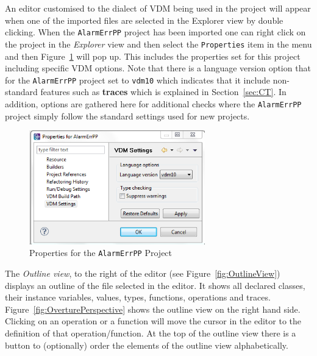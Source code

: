 An editor customised to the dialect of VDM being used in the project
will appear when one of the imported files are selected in the
Explorer view by double clicking. When the
\texttt{AlarmErrPP} project has been imported one can right click on the
project in the \emph{Explorer} view and then select the
\texttt{Properties} item in the menu and then
Figure~\ref{fig:settings} will pop up. This includes the properties set
for this project including specific VDM options. Note that there is a
language version option that for the \texttt{AlarmErrPP}
project set to \texttt{vdm10} which indicates that it include
non-standard features such as {\bf\ttfamily traces} which is explained
in Section~\ref{sec:CT}. In addition, options are gathered here for
additional checks where the \texttt{AlarmErrPP} project simply follow
the standard settings used for new projects.

\begin{figure}[!htb]
\begin{center}
  \includegraphics[width=3.0in]{figures/settings}
  \caption[labelInTOC]{Properties for the \texttt{AlarmErrPP} Project}
  \label{fig:settings}
\end{center}
\end{figure}



The \emph{Outline view}, to the right of the editor (see
Figure~\ref{fig:OutlineView}) displays an outline of the file selected
in the editor. It shows all declared classes, their instance variables,
values, types, functions, operations and traces.
Figure~\ref{fig:OverturePerspective} shows the outline view on the
right hand side. Clicking on an operation or a function will move the
cursor in the editor to the definition of that operation/function. At
the top of the outline view there is a button to (optionally) order
the elements of the outline view alphabetically.

